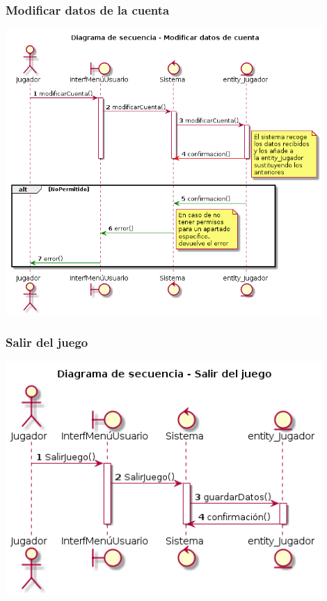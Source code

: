 \subsubsection{Modificar datos de la cuenta}
\begin{center}
  \includegraphics[width=0.9\textwidth]{./imatges/jugador/Modificar_datos_de_cuenta.png}
  \end{center}

\subsubsection{Salir del juego}
\begin{center}
  \includegraphics[width=0.9\textwidth]{./imatges/jugador/Salir_del_juego.png}
  \end{center}

